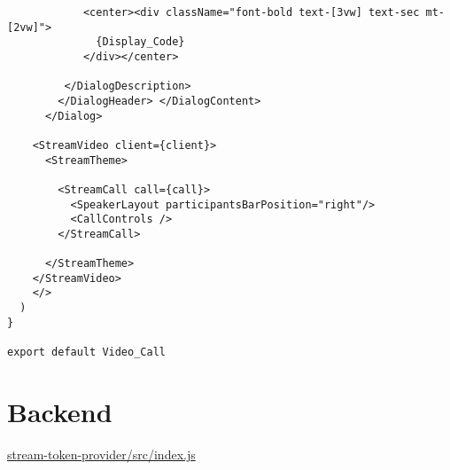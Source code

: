 \begin{verbatim}
            <center><div className="font-bold text-[3vw] text-sec mt-[2vw]">
              {Display_Code}
            </div></center>

         </DialogDescription>
        </DialogHeader> </DialogContent>
      </Dialog>

    <StreamVideo client={client}>
      <StreamTheme>

        <StreamCall call={call}>
          <SpeakerLayout participantsBarPosition="right"/>
          <CallControls />
        </StreamCall>

      </StreamTheme>
    </StreamVideo>
    </>
  )
}

export default Video_Call
\end{verbatim}

\section{Backend}

\underline{stream-token-provider/src/index.js}

